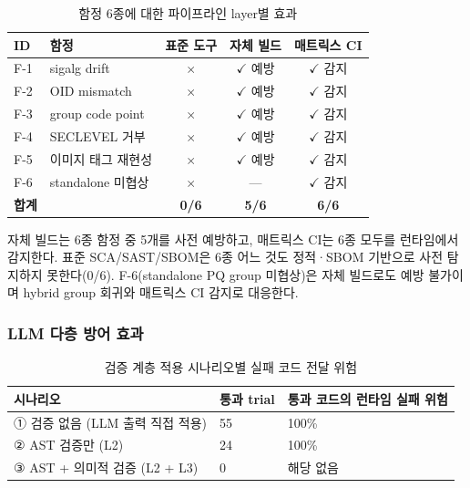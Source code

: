 \begin{table}[htbp]
\centering
\renewcommand{\arraystretch}{1.3}
\caption{함정 6종에 대한 파이프라인 layer별 효과}
\label{tab:pipeline_effect}
\begin{tabular}{p{0.5cm}p{3cm}ccc}
\toprule
ID & 함정 & 표준 도구 & 자체 빌드 & 매트릭스 CI \\
\midrule
F-1 & sigalg drift & $\times$ & $\checkmark$ 예방 & $\checkmark$ 감지 \\
F-2 & OID mismatch & $\times$ & $\checkmark$ 예방 & $\checkmark$ 감지 \\
F-3 & group code point & $\times$ & $\checkmark$ 예방 & $\checkmark$ 감지 \\
F-4 & SECLEVEL 거부 & $\times$ & $\checkmark$ 예방 & $\checkmark$ 감지 \\
F-5 & 이미지 태그 재현성 & $\times$ & $\checkmark$ 예방 & $\checkmark$ 감지 \\
F-6 & standalone 미협상 & $\times$ & --- & $\checkmark$ 감지 \\
\midrule
\textbf{합계} & & \textbf{0/6} & \textbf{5/6} & \textbf{6/6} \\
\bottomrule
\end{tabular}
\end{table}

자체 빌드는 6종 함정 중 5개를 사전 예방하고, 매트릭스 CI는 6종 모두를 런타임에서 감지한다.
표준 SCA/SAST/SBOM은 6종 어느 것도 정적·SBOM 기반으로 사전 탐지하지 못한다(0/6).
F-6(standalone PQ group 미협상)은 자체 빌드로도 예방 불가이며 hybrid group 회귀와 매트릭스 CI 감지로 대응한다.

\subsubsection{LLM 다층 방어 효과}

\begin{table}[htbp]
\centering
\renewcommand{\arraystretch}{1.3}
\caption{검증 계층 적용 시나리오별 실패 코드 전달 위험}
\label{tab:crash_risk}
\begin{tabular}{lll}
\toprule
시나리오 & 통과 trial & 통과 코드의 런타임 실패 위험 \\
\midrule
① 검증 없음 (LLM 출력 직접 적용) & 55 & 100\% \\
② AST 검증만 (L2) & 24 & 100\% \\
③ AST + 의미적 검증 (L2 + L3) & 0 & 해당 없음 \\
\bottomrule
\end{tabular}
\end{table}

